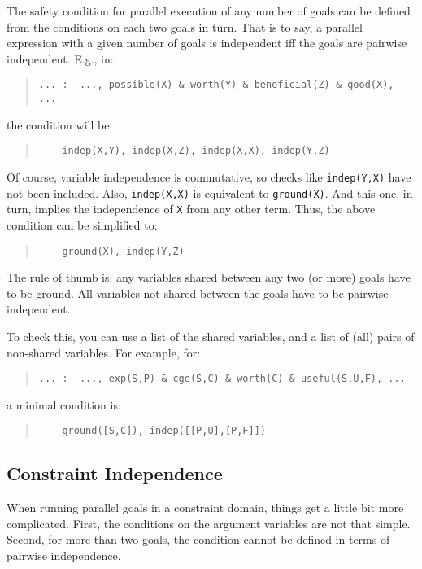 The safety condition for parallel execution of any number of goals can
be defined from the conditions on each two goals in turn. That is to
say, a parallel expression with a given number of goals is independent
iff the goals are pairwise independent. E.g., in:
\begin{quote}
\begin{verbatim}
... :- ..., possible(X) & worth(Y) & beneficial(Z) & good(X), ...
\end{verbatim}
\end{quote}
%
the condition will be:
\begin{quote}
\begin{verbatim}
    indep(X,Y), indep(X,Z), indep(X,X), indep(Y,Z)
\end{verbatim}
\end{quote}

Of course, variable independence is commutative, so checks like
\verb+indep(Y,X)+ have not been included. Also, \verb+indep(X,X)+ is
equivalent to \verb+ground(X)+. And this one, in turn, implies the
independence of \verb+X+ from any other term. Thus, the above
condition can be simplified to:
\begin{quote}
\begin{verbatim}
    ground(X), indep(Y,Z)
\end{verbatim}
\end{quote}

The rule of thumb is: any variables shared between any two (or more)
goals have to be ground. All variables not shared between the goals
have to be pairwise independent. 

To check this, you can use a list of the shared variables, and a list
of (all) pairs of non-shared variables. For example, for:
\begin{quote}
\begin{verbatim}
... :- ..., exp(S,P) & cge(S,C) & worth(C) & useful(S,U,F), ...
\end{verbatim}
\end{quote}
%
a minimal condition is:
\begin{quote}
\begin{verbatim}
    ground([S,C]), indep([[P,U],[P,F]])
\end{verbatim}
\end{quote}


\subsection{Constraint Independence}

When running parallel goals in a constraint domain, things get a
little bit more complicated. First, the conditions on the argument
variables are not that simple. Second, for more than two goals, the
condition cannot be defined in terms of pairwise independence.

